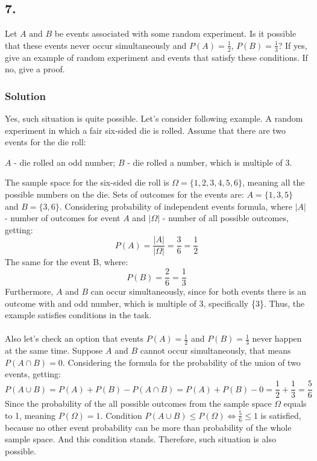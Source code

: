 \documentclass[a4paper]{article}
\newcommand{\lrl}[1]{\({#1}\)}
\begin{document}
\subsection*{7.} Let \(A \text{ and } B\) be events associated with some random experiment. Is it possible that these events never occur simultaneously and \(P(A) = \frac{1}{2}\), \(P(B) = \frac{1}{3}\)? If yes, give an example of random experiment and events that satisfy these conditions. If no, give a proof.

\subsubsection*{Solution}
Yes, such situation is quite possible. Let's consider following example.  A random experiment in which a fair six-sided die is rolled. Assume that there are two events for the die roll:
\begin{center}
\lrl{A} - die rolled an odd number;
\lrl{B} - die rolled a number, which is multiple of 3.
\end{center}
The sample space for the six-sided die roll is \(\Omega = \{1, 2, 3, 4, 5, 6 \}\), meaning all the possible numbers on the die. Sets of outcomes for the events are: \(A = \{1, 3, 5\}\) and \(B = \{3, 6\}\). Considering probability of independent events formula, where \(|A|\) - number of outcomes for event \(A\) and \(|\Omega|\) - number of all possible outcomes, getting:
\[P(A) = \frac{|A|}{|\Omega|} = \frac{3}{6} = \frac{1}{2}\]
The same for the event B, where:
\[P(B) = \frac{2}{6} = \frac{1}{3}\]
Furthermore, \(A\) and \(B\) can occur simultaneously, since for both events there is an outcome with and odd number, which is multiple of 3, specifically \{3\}. Thus, the example satisfies conditions in the task.\\\\Also let's check an option that events \(P(A) = \frac{1}{2}\) and \(P(B) = \frac{1}{3}\) never happen at the same time. Suppose \(A\) and \(B\) cannot occur simultaneously, that means \(P(A \cap B) = 0.\) Considering the formula for the probability of the union of two events, getting:
\[P(A \cup B) = P(A) + P(B) - P(A \cap B) = P(A) + P(B) - 0 = \frac{1}{2} + \frac{1}{3} = \frac{5}{6}\]
Since the probability of the all possible outcomes from the sample space \(\Omega\) equals to 1, meaning \(P(\Omega) = 1\). Condition \(P(A \cup B) \leq P(\Omega) \Leftrightarrow \frac{5}{6} \leq 1 \) is satisfied, because no other event probability can be more than probability of the whole sample space. And this condition stands. Therefore, such situation is also possible.
\end{document}
